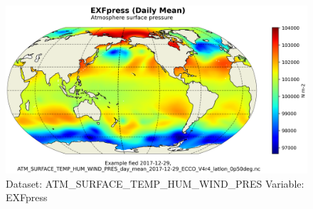 \begin{figure}[H]
\centering
\includegraphics[scale=0.55]{../images/plots/latlon_plots/Atmosphere_Surface_Temperature_Humidity_Wind_and_Pressure/EXFpress.png}
\caption{Dataset: ATM\_SURFACE\_TEMP\_HUM\_WIND\_PRES Variable: EXFpress}
\label{tab:table-ATM_SURFACE_TEMP_HUM_WIND_PRES_EXFpress-Plot}
\end{figure}
\pagebreak
